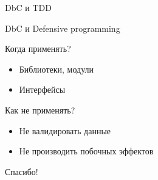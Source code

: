 \documentclass[14pt]{beamer}
\begin{document}
\begin{frame}
    \begin{center}
        DbC и TDD
    \end{center}
\end{frame}

\begin{frame}
    \begin{center}
        DbC и Defensive programming
    \end{center}
\end{frame}

\begin{frame}
    \begin{center}
        Когда применять?

        \begin{itemize}
            \item Библиотеки, модули
            \item Интерфейсы
        \end{itemize}
    \end{center}
\end{frame}

\begin{frame}
    \begin{center}
        Как не применять?

        \begin{itemize}
            \item Не валидировать данные
            \item Не производить побочных эффектов
        \end{itemize}
    \end{center}
\end{frame}

\begin{frame}
    \begin{center}
        Спасибо!
    \end{center}
\end{frame}
\end{document}
